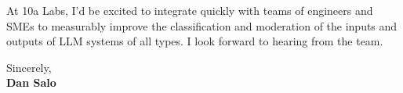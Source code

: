 \documentclass[letterpaper,11pt]{article}
\begin{document}
	\vspace{10pt}
	
	At 10a Labs, I’d be excited to integrate quickly with teams of engineers and SMEs to measurably improve the classification and moderation of the inputs and outputs of LLM systems of all types. I look forward to hearing from the team.
	
	\vspace{12pt}
	
	Sincerely,\\[10pt]
	\textbf{Dan Salo}
	
\end{document}

